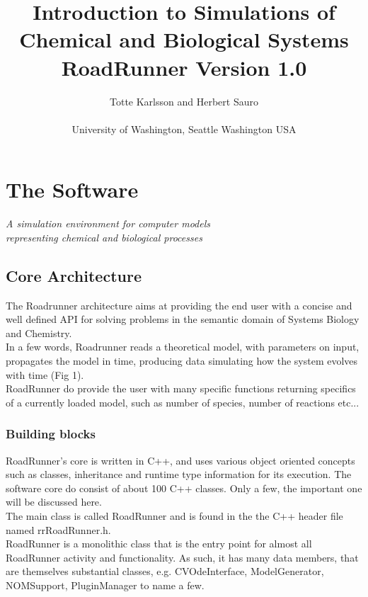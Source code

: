 \documentclass[12pt, letter, oneside]{book}
\begin{document}
\author{Totte Karlsson and Herbert Sauro
\\\\University of Washington, Seattle Washington USA}
\title{Introduction to Simulations of Chemical and Biological Systems 
\\ RoadRunner Version 1.0
}
\maketitle


\setcounter{page}{1}
\tableofcontents
{}


\chapter{The Software}
\emph{A simulation environment for computer models \\
	representing chemical and biological processes}

\section{Core Architecture}
The Roadrunner architecture aims at providing the end user with a concise and well defined API for solving problems in the semantic domain of Systems Biology and Chemistry. \\
In a few words, Roadrunner reads a theoretical model, with parameters on input, propagates the model in time, producing data simulating how the system evolves with time (Fig 1).
\\
RoadRunner do provide the user with many specific functions returning specifics of a currently loaded model, such as number of species, number of reactions etc...
   
\subsection{Building blocks}
RoadRunner's core is written in C++, and uses various object oriented concepts such as classes, inheritance and runtime type information for its execution. The software core do consist of about 100 C++ classes. Only a few, the important one will be discussed here. \\
The main class is called RoadRunner and is found in the the C++ header file named rrRoadRunner.h.\\ RoadRunner is a monolithic class that is the entry point for almost all RoadRunner activity and functionality. As such, it has many data members, that are themselves substantial classes, e.g. CVOdeInterface, ModelGenerator, NOMSupport, PluginManager to name a few.
  
\end{document}
